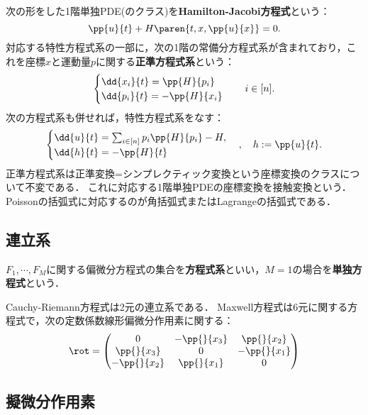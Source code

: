 \documentclass[uplatex,dvipdfmx]{jsreport}
\begin{document}
\begin{example}
    次の形をした1階単独PDE(のクラス)を\textbf{Hamilton-Jacobi方程式}という：
    \[\pp{u}{t}+H\paren{t,x,\pp{u}{x}}=0.\]
    対応する特性方程式系の一部に，次の1階の常備分方程式系が含まれており，これを座標$x$と運動量$p$に関する\textbf{正準方程式系}という：
    \[\begin{cases}
        \dd{x_i}{t}=\pp{H}{p_i}\\
        \dd{p_i}{t}=-\pp{H}{x_i}
    \end{cases}\quad i\in[n].\]
    次の方程式系も併せれば，特性方程式系をなす：
    \[\begin{cases}
        \dd{u}{t}=\sum_{i\in[n]}p_i\pp{H}{p_i}-H,\\
        \dd{h}{t}=-\pp{H}{t}
    \end{cases},\quad h:=\pp{u}{t}.\]
    正準方程式系は正準変換=シンプレクティック変換という座標変換のクラスについて不変である．
    これに対応する1階単独PDEの座標変換を接触変換という．Poissonの括弧式に対応するのが角括弧式またはLagrangeの括弧式である．
\end{example}

\subsection{連立系}

\begin{definition}
    $F_1,\cdots,F_M$に関する偏微分方程式の集合を\textbf{方程式系}といい，$M=1$の場合を\textbf{単独方程式}という．
\end{definition}

\begin{example}
    Cauchy-Riemann方程式は2元の連立系である．
    Maxwell方程式は6元に関する方程式で，次の定数係数線形偏微分作用素に関する：
    \[\rot= \begin{pmatrix}0&-\pp{}{x_3}&\pp{}{x_2}\\\pp{}{x_3}&0&-\pp{}{x_1}\\-\pp{}{x_2}&\pp{}{x_1}&0\end{pmatrix}\]
\end{example}

\subsection{擬微分作用素}
\end{document}

